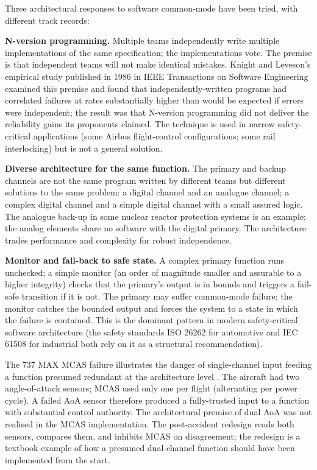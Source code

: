 Three architectural responses to software common-mode have been tried, with different track records:

\textbf{N-version programming.} Multiple teams independently write multiple implementations of the same specification; the implementations vote. The premise is that independent teams will not make identical mistakes. Knight and Leveson's empirical study published in 1986 in IEEE Transactions on Software Engineering examined this premise and found that independently-written programs had correlated failures at rates substantially higher than would be expected if errors were independent; the result was that N-version programming did not deliver the reliability gains its proponents claimed. The technique is used in narrow safety-critical applications (some Airbus flight-control configurations; some rail interlocking) but is not a general solution.

\textbf{Diverse architecture for the same function.} The primary and backup channels are not the same program written by different teams but different solutions to the same problem: a digital channel and an analogue channel; a complex digital channel and a simple digital channel with a small assured logic. The analogue back-up in some nuclear reactor protection systems is an example; the analog elements share no software with the digital primary. The architecture trades performance and complexity for robust independence.

\textbf{Monitor and fall-back to safe state.} A complex primary function runs unchecked; a simple monitor (an order of magnitude smaller and assurable to a higher integrity) checks that the primary's output is in bounds and triggers a fail-safe transition if it is not. The primary may suffer common-mode failure; the monitor catches the bounded output and forces the system to a state in which the failure is contained. This is the dominant pattern in modern safety-critical software architecture (the safety standards ISO 26262 for automotive and IEC 61508 for industrial both rely on it as a structural recommendation).

The 737 MAX MCAS failure illustrates the danger of single-channel input feeding a function presumed redundant at the architecture level \cite{acc:house-737max-2020}. The aircraft had two angle-of-attack sensors; MCAS used only one per flight (alternating per power cycle). A failed AoA sensor therefore produced a fully-trusted input to a function with substantial control authority. The architectural premise of dual AoA was not realised in the MCAS implementation. The post-accident redesign reads both sensors, compares them, and inhibits MCAS on disagreement; the redesign is a textbook example of how a presumed dual-channel function should have been implemented from the start.

